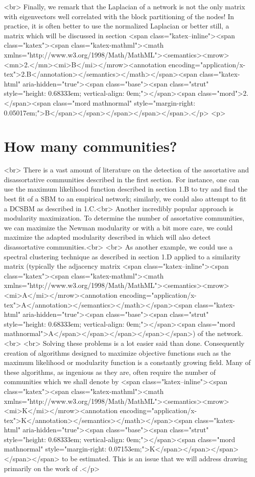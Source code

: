 \newline<br>
Finally, we remark that the Laplacian of a network is not the only matrix with eigenvectors well correlated with the block partitioning of the nodes! In practice, it is often better to use the normalized Laplacian or better still, a matrix which will be discussed in section <span class="katex--inline"><span class="katex"><span class="katex-mathml"><math xmlns="http://www.w3.org/1998/Math/MathML"><semantics><mrow><mn>2.</mn><mi>B</mi></mrow><annotation encoding="application/x-tex">2.B</annotation></semantics></math></span><span class="katex-html" aria-hidden="true"><span class="base"><span class="strut" style="height: 0.68333em; vertical-align: 0em;"></span><span class="mord">2.</span><span class="mord mathnormal" style="margin-right: 0.05017em;">B</span></span></span></span></span>.</p>
<p>\section{How many communities?}<br>
There is a vast amount of literature on the detection of the assortative and disassortative communities described in the first section. For instance, one can use the maximum likelihood function described in section 1.B to try and find the best fit of a SBM to an empirical network; similarly, we could also attempt to fit a DCSBM as described in 1.C.<br>
Another incredibly popular approach is modularity maximization. To determine the number of assortative communities, we can maximize the Newman modularity \cite{newman_2006} or with a bit more care, we could maximize the adapted modularity described in \cite{Reichardt} which will also detect disassortative communities.<br>
\newline<br>
As another example, we could use a spectral clustering technique as described in section 1.D applied to a similarity matrix (typically the adjacency matrix <span class="katex--inline"><span class="katex"><span class="katex-mathml"><math xmlns="http://www.w3.org/1998/Math/MathML"><semantics><mrow><mi>A</mi></mrow><annotation encoding="application/x-tex">A</annotation></semantics></math></span><span class="katex-html" aria-hidden="true"><span class="base"><span class="strut" style="height: 0.68333em; vertical-align: 0em;"></span><span class="mord mathnormal">A</span></span></span></span></span>) of the network.<br>
\newline<br>
Solving these problems is a lot easier said than done. Consequently creation of algorithms designed to maximize objective functions such as the maximum likelihood or modularity function is a constantly growing field. Many of these algorithms, as ingenious as they are, often require the number of communities which we shall denote by <span class="katex--inline"><span class="katex"><span class="katex-mathml"><math xmlns="http://www.w3.org/1998/Math/MathML"><semantics><mrow><mi>K</mi></mrow><annotation encoding="application/x-tex">K</annotation></semantics></math></span><span class="katex-html" aria-hidden="true"><span class="base"><span class="strut" style="height: 0.68333em; vertical-align: 0em;"></span><span class="mord mathnormal" style="margin-right: 0.07153em;">K</span></span></span></span></span> to be estimated. This is an issue that we will address drawing primarily on the work of \cite{SaadeBethe}.</p>
